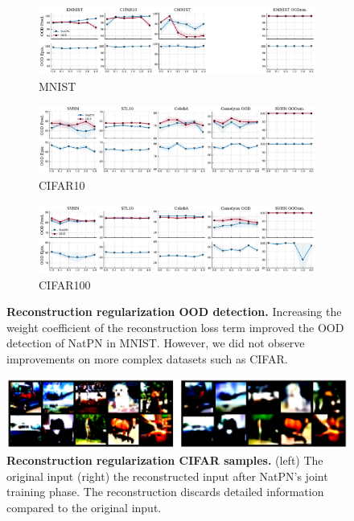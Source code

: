 \begin{figure}[!htb]
    \centering
    \begin{subfigure}[b]{\textwidth}
        \includegraphics[width=\textwidth]{sections/008_iclr2023/figures/reconst_ood_mnist.pdf}
        \caption{MNIST}
        \label{fig:rec_ood_mnist}
    \end{subfigure}
    \begin{subfigure}[b]{\textwidth}
        \includegraphics[width=\textwidth]{sections/008_iclr2023/figures/reconst_ood_cifar10.pdf}
        \caption{CIFAR10}
        \label{fig:rec_ood_cifar10}
    \end{subfigure}
    \begin{subfigure}[b]{\textwidth}
        \includegraphics[width=\textwidth]{sections/008_iclr2023/figures/reconst_ood_cifar100.pdf}
        \caption{CIFAR100}
        \label{fig:rec_ood_cifar100}
    \end{subfigure}
    
    \caption{\textbf{Reconstruction regularization OOD detection.} Increasing the weight coefficient of the reconstruction loss term improved the OOD detection of NatPN in MNIST. However, we did not observe improvements on more complex datasets such as CIFAR.}
    \label{fig:rec_ood}
\end{figure}


\begin{figure}[!htb]
    \centering
    \includegraphics[width=0.8\linewidth]{sections/008_iclr2023/figures/reconst_samples.png}
    \caption{\textbf{Reconstruction regularization CIFAR samples.} (left) The original input (right) the reconstructed input after NatPN's joint training phase. The reconstruction discards detailed information compared to the original input. }
    \label{fig:rec_samples}
\end{figure}


